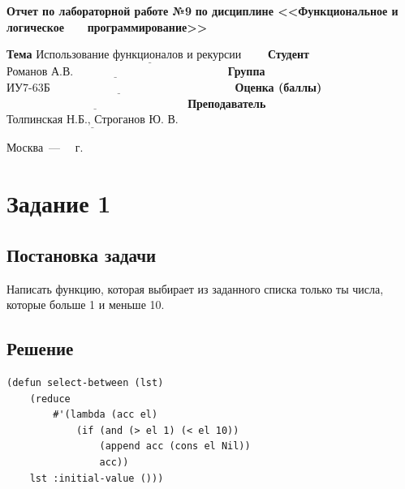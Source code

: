 \documentclass[12pt]{report}
\begin{document}
\begin{titlepage}
		\begin{center}
			\noindent\begin{minipage}{1.1\textwidth}\centering
				\Large\textbf{  Отчет по лабораторной работе №9}\newline
				\textbf{по дисциплине <<Функциональное и логическое}\newline
				\textbf{~~~программирование>>}\newline\newline
			\end{minipage}
		\end{center}
		
		\noindent\textbf{Тема} $\underline{\text{Использование функционалов и рекурсии~~~~~~}}$\newline\newline
		\noindent\textbf{Студент} $\underline{\text{Романов А.В.~~~~~~~~~~~~~~~~~~~~~~~~~~~~~~~~~~~~~~~~}}$\newline\newline
		\noindent\textbf{Группа} $\underline{\text{ИУ7-63Б~~~~~~~~~~~~~~~~~~~~~~~~~~~~~~~~~~~~~~~~~~~~~~~~}}$\newline\newline
		\noindent\textbf{Оценка (баллы)} $\underline{\text{~~~~~~~~~~~~~~~~~~~~~~~~~~~~~~~~~~~~~~~~~~~~~~~}}$\newline\newline
		\noindent\textbf{Преподаватель} $\underline{\text{Толпинская Н.Б., Строганов Ю. В.}}$\newline\newline\newline
		
		\begin{center}
			\vfill
			Москва~---~\the\year
			~г.
		\end{center}
	\end{titlepage}
	
	
\section*{Задание 1}
\subsection*{Постановка задачи}
Написать функцию, которая выбирает из заданного списка только ты числа, которые больше 1 и меньше 10.

\subsection*{Решение}
\begin{lstlisting}
(defun select-between (lst)
	(reduce
		#'(lambda (acc el)
			(if (and (> el 1) (< el 10))
				(append acc (cons el Nil))
				acc))
	lst :initial-value ()))
\end{lstlisting}
\end{document}
